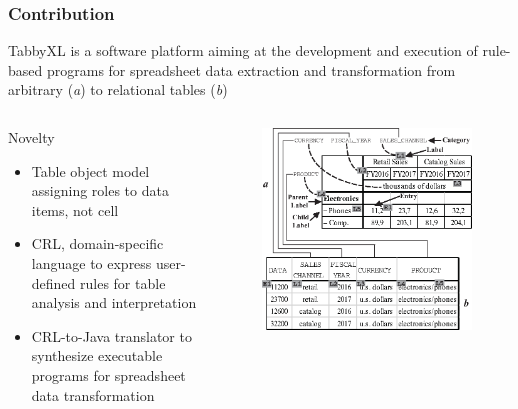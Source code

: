 \documentclass{beamer}
\begin{document}
\begin{frame}
\frametitle{Contribution}

\small TabbyXL is a software platform aiming at the development and execution of rule-based programs for spreadsheet data extraction and transformation from arbitrary (\textit{a}) to relational tables (\textit{b})

\begin{columns}[c] %


\begin{block}{\small Novelty}
\begin{itemize}
\item \small Table object model assigning roles to data items, not cell
\item \small CRL, domain-specific language to express user-defined rules for table analysis and interpretation
\item \small CRL-to-Java translator to synthesize executable programs for spreadsheet data transformation
\end{itemize}
\end{block}

\begin{figure}
\includegraphics[width=0.85\linewidth]{intro}
\end{figure}

\end{columns}

\end{frame}
\end{document}
